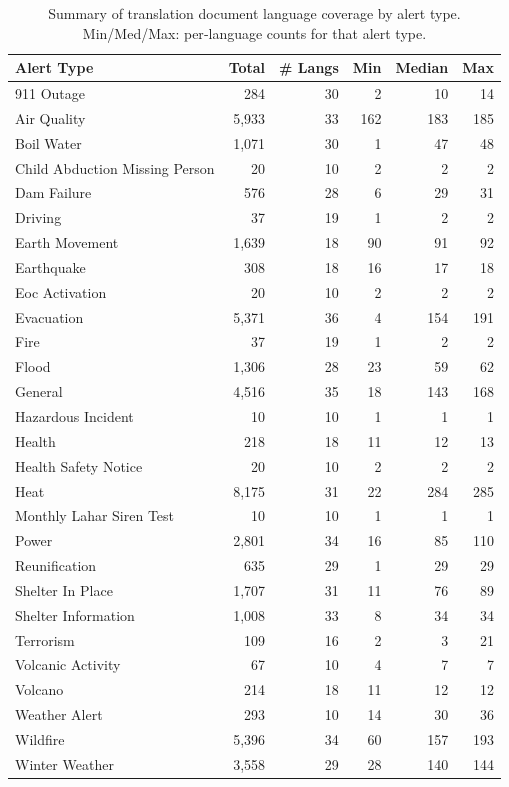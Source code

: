 \begin{table}
\centering
\setlength{\tabcolsep}{3pt}
\renewcommand{\arraystretch}{0.95}
\begin{tabular}{lrrrrr}
\toprule
\textbf{Alert Type} & \textbf{Total} & \textbf{\# Langs} & \textbf{Min} & \textbf{Median} & \textbf{Max} \\
\midrule
911 Outage & 284 & 30 & 2 & 10 & 14 \\
Air Quality & 5,933 & 33 & 162 & 183 & 185 \\
Boil Water & 1,071 & 30 & 1 & 47 & 48 \\
Child Abduction Missing Person & 20 & 10 & 2 & 2 & 2 \\
Dam Failure & 576 & 28 & 6 & 29 & 31 \\
Driving & 37 & 19 & 1 & 2 & 2 \\
Earth Movement & 1,639 & 18 & 90 & 91 & 92 \\
Earthquake & 308 & 18 & 16 & 17 & 18 \\
Eoc Activation & 20 & 10 & 2 & 2 & 2 \\
Evacuation & 5,371 & 36 & 4 & 154 & 191 \\
Fire & 37 & 19 & 1 & 2 & 2 \\
Flood & 1,306 & 28 & 23 & 59 & 62 \\
General & 4,516 & 35 & 18 & 143 & 168 \\
Hazardous Incident & 10 & 10 & 1 & 1 & 1 \\
Health & 218 & 18 & 11 & 12 & 13 \\
Health Safety Notice & 20 & 10 & 2 & 2 & 2 \\
Heat & 8,175 & 31 & 22 & 284 & 285 \\
Monthly Lahar Siren Test & 10 & 10 & 1 & 1 & 1 \\
Power & 2,801 & 34 & 16 & 85 & 110 \\
Reunification & 635 & 29 & 1 & 29 & 29 \\
Shelter In Place & 1,707 & 31 & 11 & 76 & 89 \\
Shelter Information & 1,008 & 33 & 8 & 34 & 34 \\
Terrorism & 109 & 16 & 2 & 3 & 21 \\
Volcanic Activity & 67 & 10 & 4 & 7 & 7 \\
Volcano & 214 & 18 & 11 & 12 & 12 \\
Weather Alert & 293 & 10 & 14 & 30 & 36 \\
Wildfire & 5,396 & 34 & 60 & 157 & 193 \\
Winter Weather & 3,558 & 29 & 28 & 140 & 144 \\
\bottomrule
\end{tabular}
\caption{Summary of translation document language coverage by alert type. Min/Med/Max: per‑language counts for that alert type. }
\label{tab:combined_translations_per_alert_lang_summary}
\end{table}